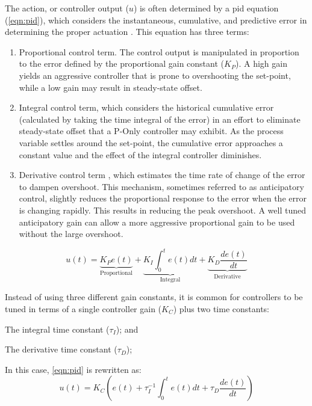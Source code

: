 The action, or controller output ($u$) is often determined by a \acf{pid} equation (\ref{eqn:pid}), which considers the instantaneous, cumulative, and predictive error in determining the proper actuation \cite[Ch. 5]{Bequette}. This equation has three terms:
\begin{enumerate}
\item Proportional control term. The control output is manipulated in proportion to the error defined by the proportional gain constant ($K_P$). A high gain yields an aggressive controller that is prone to overshooting the set-point, while a low gain may result in steady-state offset.  
\item Integral control term, which considers the historical cumulative error (calculated by taking the time integral of the error) in an effort to eliminate steady-state offset that a P-Only controller may exhibit. As the process variable settles around the set-point, the cumulative error approaches a constant value and the effect of the integral controller diminishes.
\item Derivative control term , which estimates the time rate of change of the error to dampen overshoot. This mechanism, sometimes referred to as anticipatory control, slightly reduces the proportional response to the error when the error is changing rapidly. This results in reducing the peak overshoot. A well tuned anticipatory gain can allow a more aggressive proportional gain to be used without the large overshoot.
\end{enumerate}

\begin{equation}\label{eqn:pid}
    u(t) 
    = \underbrace{K_P e(t)}_{\text{Proportional}} 
    + \underbrace{K_I \int_0^t e(t)dt}_{\text{Integral}} 
    + \underbrace{K_D \frac{de(t)}{dt}}_{\text{Derivative}}
\end{equation}

Instead of using three different gain constants, it is common for controllers to be tuned in terms of a single controller gain ($K_C$) plus two time constants: 
\begin{enumerate*}
    \item The integral time constant ($\tau_I$); and
    \item The derivative time constant ($\tau_D$);
\end{enumerate*}
In this case, \ref{eqn:pid} is rewritten as:
\begin{equation}\label{eqn:pid-tau}
    u(t) = K_C \left( e(t) + \tau_I^{-1} \int_0^t e(t)dt + \tau_D \frac{de(t)}{dt}\right)
\end{equation}

